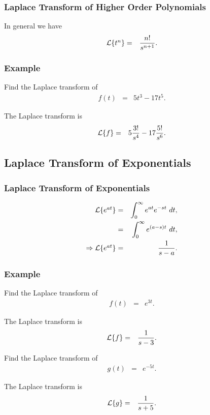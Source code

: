 \begin{frame}
  \frametitle{Laplace Transform of Higher Order Polynomials}

  In general we have
  \begin{eqnarray*}
    \laplace{t^n} & = & \frac{n!}{s^{n+1}}.
  \end{eqnarray*}

\end{frame}


\begin{frame}
  \frametitle{Example}

  Find the Laplace transform of 
  \begin{eqnarray*}
    f(t) & = & 5 t^3 - 17 t^5.
  \end{eqnarray*}

  The Laplace transform is
  \begin{eqnarray*}
    \laplace{f} & = & 5 \frac{3!}{s^4} - 17 \frac{5!}{s^6}.
  \end{eqnarray*}

\end{frame}


\subsection{Laplace Transform of Exponentials}

\begin{frame}
  \frametitle{Laplace Transform of Exponentials}

  \begin{eqnarray*}
    \laplace{e^{at}} & = & \int^\infty_0 e^{at} e^{-st} ~ dt, \\
    & = & \int^\infty_0 e^{(a-s)t} ~ dt, \\
    \Rightarrow \laplace{e^{at}} & = & \frac{1}{s-a}.
  \end{eqnarray*}

\end{frame}


\begin{frame}
  \frametitle{Example}

  Find the Laplace transform of 
  \begin{eqnarray*}
    f(t) & = & e^{3t}.
  \end{eqnarray*}

  The Laplace transform is
  \begin{eqnarray*}
    \laplace{f} & = & \frac{1}{s-3}.
  \end{eqnarray*}

  {
    Find the Laplace transform of 
    \begin{eqnarray*}
      g(t) & = & e^{-5t}.
    \end{eqnarray*}

    The Laplace transform is
    \begin{eqnarray*}
      \laplace{g} & = & \frac{1}{s+5}.
    \end{eqnarray*}
  }


\end{frame}

